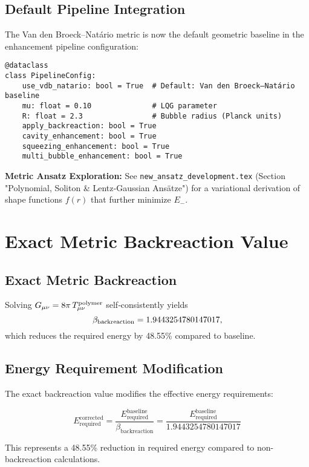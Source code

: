 \documentclass[11pt]{article}
\begin{document}
\subsection{Default Pipeline Integration}
The Van den Broeck–Natário metric is now the default geometric baseline in the enhancement pipeline configuration:

\begin{verbatim}
@dataclass
class PipelineConfig:
    use_vdb_natario: bool = True  # Default: Van den Broeck–Natário baseline
    mu: float = 0.10              # LQG parameter
    R: float = 2.3                # Bubble radius (Planck units)
    apply_backreaction: bool = True
    cavity_enhancement: bool = True
    squeezing_enhancement: bool = True
    multi_bubble_enhancement: bool = True
\end{verbatim}

\bigskip
\noindent\textbf{Metric Ansatz Exploration:}
See \texttt{new\_ansatz\_development.tex} (Section "Polynomial, Soliton \& Lentz‐Gaussian Ansätze") for a variational derivation of shape functions $f(r)$ that further minimize $E_{-}$.

\section{Exact Metric Backreaction Value}

\subsection{Exact Metric Backreaction}
Solving $G_{\mu\nu} = 8\pi\,T_{\mu\nu}^{\rm polymer}$ self‐consistently yields
\[
  \beta_{\rm backreaction} = 1.9443254780147017,
\]
which reduces the required energy by 48.55\% compared to baseline.

\subsection{Energy Requirement Modification}
The exact backreaction value modifies the effective energy requirements:

\begin{equation}
E_{\text{required}}^{\text{corrected}} = \frac{E_{\text{required}}^{\text{baseline}}}{\beta_{\text{backreaction}}} = \frac{E_{\text{required}}^{\text{baseline}}}{1.9443254780147017}
\end{equation}

This represents a 48.55\% reduction in required energy compared to non-backreaction calculations.
\end{document}

